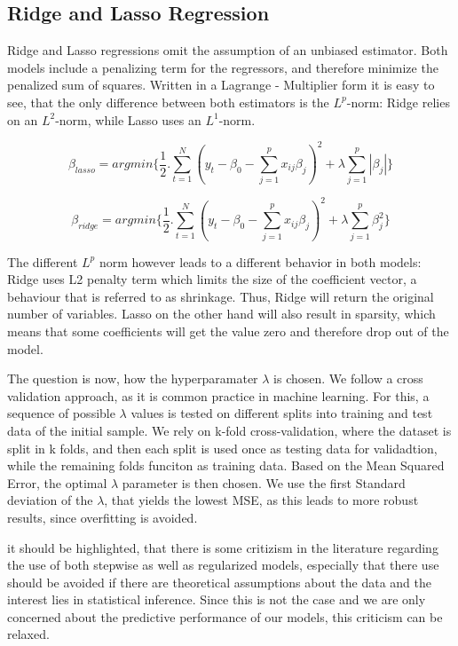 \subsection{Ridge and Lasso Regression}
Ridge and Lasso regressions omit the assumption of an unbiased estimator. Both models include a penalizing term for the regressors, and therefore minimize the penalized sum of squares.  Written in a Lagrange - Multiplier form it is easy to see, that the only difference between both estimators is the $L^{p}$-norm: Ridge relies on an $L^{2}$-norm, while Lasso uses an  $L^{1}$-norm.  

\begin{equation}
\beta_{lasso}=argmin\{\frac{1}{2}.\sum_{t=1}^{N}(y_{t}-\beta_{0}-\sum_{j=1}^{p}x_{ij}\beta_{j})^{2}+\lambda\sum_{j=1}^{p}|\beta_{j}|\}
\end{equation}

\begin{equation}
\beta_{ridge}=argmin\{\frac{1}{2}.\sum_{t=1}^{N}(y_{t}-\beta_{0}-\sum_{j=1}^{p}x_{ij}\beta_{j})^{2}+\lambda\sum_{j=1}^{p}\beta_{j}^{2}\}
\end{equation}

The different $L^{p}$ norm however leads to a different behavior in both models: Ridge uses L2 penalty term which limits the size of the coefficient vector, a behaviour that is referred to as shrinkage. Thus, Ridge will return the original number of variables.  Lasso on the other hand will also result in sparsity, which means that some coefficients will get the value zero and therefore drop out of the model. 

The question is now, how the hyperparamater $\lambda$ is chosen. We follow a cross validation approach, as it is common practice in machine learning. For this, a sequence of possible $\lambda$ values is tested on different splits into training and test data of the initial sample.  We rely on  k-fold cross-validation, where the dataset is split in k folds, and then each split is used once as testing data for validadtion, while the remaining folds funciton as training data. 
Based on the Mean Squared Error, the optimal $\lambda$ parameter is then chosen. We use the first Standard deviation of the $\lambda$, that yields the lowest MSE, as this leads to more robust results, since overfitting is avoided. 

it should be highlighted, that there is some critizism in the literature regarding the use of both stepwise as well as regularized models, especially that there use should be avoided if there are theoretical assumptions about the data and the interest lies in statistical inference. Since this is not the case and we are only concerned about the predictive performance of our models, this criticism can be relaxed. 



